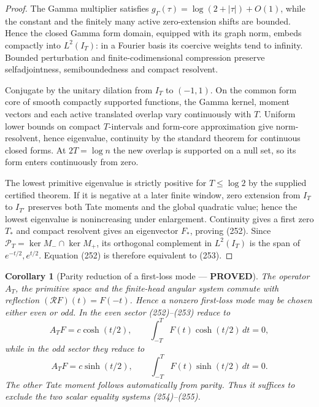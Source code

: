 \documentclass[11pt]{article}
\newtheorem{corollary}[theorem]{Corollary}
\newcommand{\PROVED}{\textcolor{green!45!black}{\textbf{PROVED}}}
\begin{document}
\begin{proof}
The Gamma multiplier satisfies
$g_\Gamma(\tau)=\log(2+|\tau|)+O(1)$, while the constant and the finitely
many active zero-extension shifts are bounded.  Hence the closed Gamma form
domain, equipped with its graph norm, embeds compactly into $L^2(I_T)$: in a
Fourier basis its coercive weights tend to infinity.  Bounded perturbation and
finite-codimensional compression preserve selfadjointness, semiboundedness
and compact resolvent.

Conjugate by the unitary dilation from $I_T$ to $(-1,1)$.  On the common form
core of smooth compactly supported functions, the Gamma kernel, moment
vectors and each active translated overlap vary continuously with $T$.
Uniform lower bounds on compact $T$-intervals and form-core approximation
give norm-resolvent, hence eigenvalue, continuity by the standard theorem for
continuous closed forms.  At $2T=\log n$ the new overlap is supported on a
null set, so its form enters continuously from zero.

The lowest primitive eigenvalue is strictly positive for
$T\le\log2$ by the supplied certified theorem.  If it is negative at a later
finite window, zero extension from $I_T$ to $I_{T'}$ preserves both Tate
moments and the global quadratic value; hence the lowest eigenvalue is
nonincreasing under enlargement.  Continuity gives a first zero $T_*$ and
compact resolvent gives an eigenvector $F_*$, proving (252).  Since
$\mathcal P_T=\ker M_-\cap\ker M_+$, its orthogonal complement in $L^2(I_T)$
is the span of $e^{-t/2},e^{t/2}$.  Equation (252) is therefore equivalent to
(253).
\end{proof}

\begin{corollary}[Parity reduction of a first-loss mode --- \PROVED]
The operator $A_T$, the primitive space and the finite-head angular system
commute with reflection $(\mathcal RF)(t)=F(-t)$.  Hence a nonzero first-loss
mode may be chosen either even or odd.  In the even sector (252)--(253) reduce
to
\begin{equation}
 A_TF=c\cosh(t/2),
 \qquad \int_{-T}^TF(t)\cosh(t/2)\,dt=0,              \tag{254}
\end{equation}
while in the odd sector they reduce to
\begin{equation}
 A_TF=c\sinh(t/2),
 \qquad \int_{-T}^TF(t)\sinh(t/2)\,dt=0.              \tag{255}
\end{equation}
The other Tate moment follows automatically from parity.  Thus it suffices to
exclude the two scalar equality systems (254)--(255).
\end{corollary}
\end{document}
